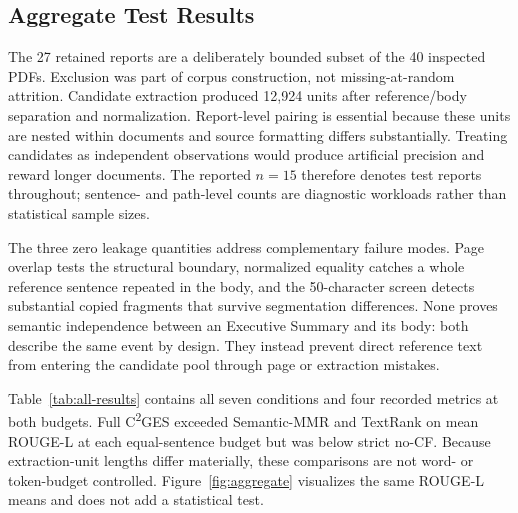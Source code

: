 \documentclass[applsci,article,submit,moreauthors]{Definitions/mdpi}
\newcommand{\cges}{C\textsuperscript{2}GES}
\begin{document}
\subsection{Aggregate Test Results}

The 27 retained reports are a deliberately bounded subset of the 40 inspected PDFs. Exclusion was part of corpus construction, not missing-at-random attrition. Candidate extraction produced 12,924 units after reference/body separation and normalization. Report-level pairing is essential because these units are nested within documents and source formatting differs substantially. Treating candidates as independent observations would produce artificial precision and reward longer documents. The reported $n=15$ therefore denotes test reports throughout; sentence- and path-level counts are diagnostic workloads rather than statistical sample sizes.

The three zero leakage quantities address complementary failure modes. Page overlap tests the structural boundary, normalized equality catches a whole reference sentence repeated in the body, and the 50-character screen detects substantial copied fragments that survive segmentation differences. None proves semantic independence between an Executive Summary and its body: both describe the same event by design. They instead prevent direct reference text from entering the candidate pool through page or extraction mistakes.

Table~\ref{tab:all-results} contains all seven conditions and four recorded metrics at both budgets. Full \cges{} exceeded Semantic-MMR and TextRank on mean ROUGE-L at each equal-sentence budget but was below strict no-CF. Because extraction-unit lengths differ materially, these comparisons are not word- or token-budget controlled. Figure~\ref{fig:aggregate} visualizes the same ROUGE-L means and does not add a statistical test.
\end{document}
